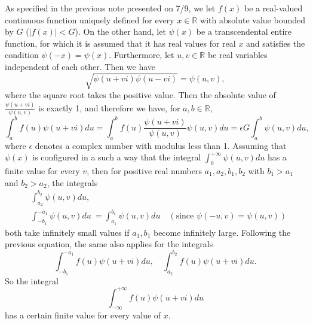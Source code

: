 \documentclass{article}
\begin{document}
As specified in the previous note presented on 7/9, we let $f(x)$ be a real-valued continuous function uniquely defined for every $x\in\mathbb{R}$ with absolute value bounded by $G$ ($|f(x)|<G$). On the other hand, let $\psi(x)$ be a transcendental entire function, for which it is assumed that it has real values for real $x$ and satisfies the condition $\psi(-x)=\psi(x)$. Furthermore, let $u,v\in\mathbb{R}$ be real variables independent of each other. Then we have
\begin{equation*}
\sqrt{\psi(u+vi)\psi(u-vi)}=\psi(u,v),
\end{equation*}
where the square root takes the positive value. Then the absolute value of $\frac{\psi(u+vi)}{\psi(u,v)}$ is exactly 1, and therefore we have, for $a,b\in\mathbb{R}$,
\begin{equation*}
\int_a^b f(u)\psi(u+vi)du=\int_a^b f(u)\frac{\psi(u+vi)}{\psi(u,v)}\psi(u,v)du=\epsilon G \int_a^b \psi(u,v)du,
\end{equation*}
where $\epsilon$ denotes a complex number with modulus less than 1. Assuming that $\psi(x)$ is configured in a such a way that the integral $\int_0^{+\infty}\psi(u,v)du$ has a finite value for every $v$, then for positive real numbers $a_1,a_2,b_1,b_2$ with $b_1>a_1$ and $b_2>a_2$, the integrals
\begin{align*}
&\int_{a_2}^{b_2}\psi(u,v)du,\\
&\int_{-b_1}^{-a_1}\psi(u,v)du\ =\int_{a_1}^{b_1}\psi(u,v)du\quad(\text{since }\psi(-u,v)=\psi(u,v))
\end{align*}
both take infinitely small values if $a_1,b_1$ become infinitely large. Following the previous equation, the same also applies for the integrals 
\begin{equation*}
\int_{-b_1}^{-a_1}f(u)\psi(u+vi)du, \quad \int_{a_2}^{b_2}f(u)\psi(u+vi)du.
\end{equation*}
So the integral
\begin{equation*}
\int_{-\infty}^{+\infty} f(u)\psi(u+vi)du
\end{equation*}
has a certain finite value for every value of $x$.
\end{document}
